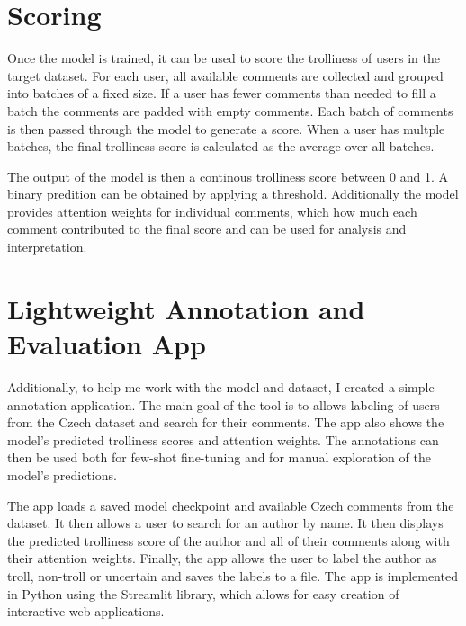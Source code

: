 \documentclass[twoside]{ctuthesis}
\theoremstyle{plain}
\theoremstyle{definition}
\theoremstyle{note}
\begin{document}
\section{Scoring}
Once the model is trained, it can be used to score the trolliness of users in the target dataset. For each user, all available comments are collected and grouped into batches of a fixed size. If a user has fewer comments than needed to fill a batch the comments are padded with empty comments. Each batch of comments is then passed through the model to generate a score. When a user has multple batches, the final trolliness score is calculated as the average over all batches.\par
The output of the model is then a continous trolliness score between 0 and 1. A binary predition can be obtained by applying a threshold. Additionally the model provides attention weights for individual comments, which how much each comment contributed to the final score and can be used for analysis and interpretation.\par

\section{Lightweight Annotation and Evaluation App}

Additionally, to help me work with the model and dataset, I created a simple annotation application. The main goal of the tool is to allows labeling of users from the Czech dataset and search for their comments. The app also shows the model's predicted trolliness scores and attention weights. The annotations can then be used both for few-shot fine-tuning and for manual exploration of the model's predictions.\par
The app loads a saved model checkpoint and available Czech comments from the dataset. It then allows a user to search for an author by name. It then displays the predicted trolliness score of the author and all of their comments along with their attention weights. Finally, the app allows the user to label the author as troll, non-troll or uncertain and saves the labels to a file. The app is implemented in Python using the Streamlit library, which allows for easy creation of interactive web applications.\par
\end{document}
